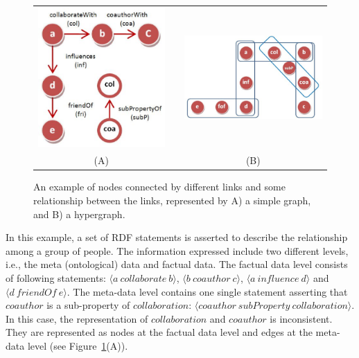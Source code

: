\begin{figure}[tbh]
\begin{center}
\begin{tabular}{ccc}
\includegraphics[width=.25\textwidth]{fig/reg_graph.eps} & &
\includegraphics[width=.43\textwidth]{fig/hypergraph.eps}\\
(A) & & (B)\\
\end{tabular}
\end{center}
\caption[A comparison between a simple graph and a hypergraph]{\label{fig:graphcomp} An example of nodes connected by different links and some relationship between the links, represented by A) a simple graph, and B) a hypergraph.}
\end{figure}

\begin{myexp}
\label{graphcomp}
In this example, a set of RDF statements is asserted to describe the relationship among a group of people. The information expressed include two different levels, i.e., the meta (ontological) data and factual data. The factual data level consists of following statements: $\langle a~ collaborate~ b\rangle$, $\langle b~ coauthor~ c\rangle$, $\langle a~ influence~ d\rangle$ and $\langle d~ friendOf~ e\rangle$. The meta-data level contains one single statement asserting that $coauthor$ is a sub-property of $collaboration$: $\langle coauthor~ subProperty~ collaboration\rangle$. In this case, the representation of $collaboration$ and $coauthor$ is inconsistent. They are represented as nodes at the factual data level and edges at the meta-data level (see Figure~\ref{fig:graphcomp}(A)).
\end{myexp}

